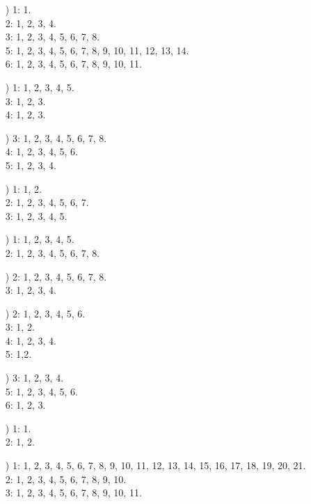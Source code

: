 \documentclass[a4paper,11pt]{article}
\numberwithin{equation}{section}
\begin{document}
\begin{itemize}
\item[\romannumeral12)] 1: 1. \\
  2: 1, 2, 3, 4. \\
  3: 1, 2, 3, 4, 5, 6, 7, 8. \\
  5: 1, 2, 3, 4, 5, 6, 7, 8, 9, 10, 11, 12, 13, 14. \\
  6: 1, 2, 3, 4, 5, 6, 7, 8, 9, 10, 11.

\item[\romannumeral13)] 1: 1, 2, 3, 4, 5. \\
  3: 1, 2, 3. \\
  4: 1, 2, 3.

\item[\romannumeral14)] 3: 1, 2, 3, 4, 5, 6, 7, 8. \\
  4: 1, 2, 3, 4, 5, 6. \\
  5: 1, 2, 3, 4.

\item[\romannumeral15)] 1: 1, 2. \\
  2: 1, 2, 3, 4, 5, 6, 7. \\
  3: 1, 2, 3, 4, 5.

\item[\romannumeral16)] 1: 1, 2, 3, 4, 5. \\
  2: 1, 2, 3, 4, 5, 6, 7, 8.

\item[\romannumeral17)] 2: 1, 2, 3, 4, 5, 6, 7, 8. \\
  3: 1, 2, 3, 4.

\item[\romannumeral18)] 2: 1, 2, 3, 4, 5, 6. \\
  3: 1, 2. \\
  4: 1, 2, 3, 4. \\
  5: 1,2.

\item[\romannumeral19)] 3: 1, 2, 3, 4. \\
  5: 1, 2, 3, 4, 5, 6. \\
  6: 1, 2, 3.

\item[\romannumeral20)] 1: 1. \\
  2: 1, 2.

\item[\romannumeral21)] 1: 1, 2, 3, 4, 5, 6, 7, 8, 9, 10, 11, 12, 13, 14,
  15, 16, 17, 18, 19, 20, 21. \\
  2: 1, 2, 3, 4, 5, 6, 7, 8, 9, 10. \\
  3: 1, 2, 3, 4, 5, 6, 7, 8, 9, 10, 11.

\end{itemize}
\end{document}
